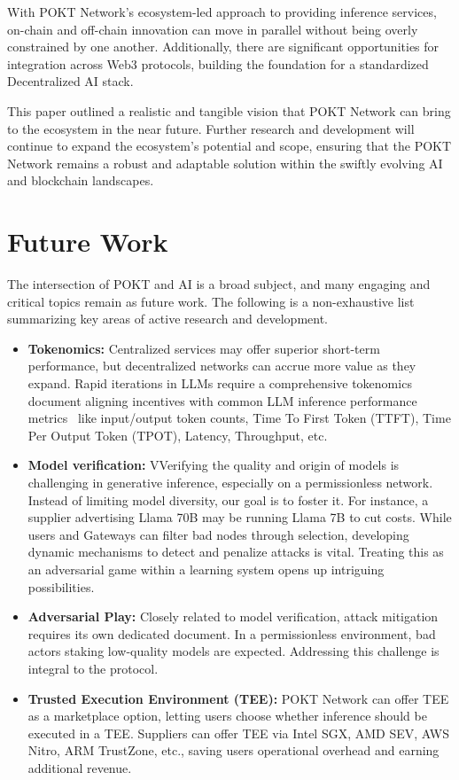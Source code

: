 \documentclass[conference,compsoc]{IEEEtran}
\begin{document}
With POKT Network’s ecosystem-led approach to providing inference services, on-chain and off-chain innovation can move in parallel without being overly constrained by one another. Additionally, there are significant opportunities for integration across Web3 protocols, building the foundation for a standardized Decentralized AI stack.

This paper outlined a realistic and tangible vision that POKT Network can bring to the ecosystem in the near future. Further research and development will continue to expand the ecosystem's potential and scope, ensuring that the POKT Network remains a robust and adaptable solution within the swiftly evolving AI and blockchain landscapes.

\section{Future Work}
The intersection of POKT and AI is a broad subject, and many engaging and critical topics remain as future work. The following is a non-exhaustive list summarizing key areas of active research and development.

\begin{itemize}
    \item \textbf{Tokenomics:} Centralized services may offer superior short-term performance, but decentralized networks can accrue more value as they expand. Rapid iterations in LLMs require a comprehensive tokenomics document aligning incentives with common LLM inference performance metrics~\cite{databricksInferencePerformance} like input/output token counts, Time To First Token (TTFT), Time Per Output Token (TPOT), Latency, Throughput, etc.

    \item \textbf{Model verification:} VVerifying the quality and origin of models is challenging in generative inference, especially on a permissionless network. Instead of limiting model diversity, our goal is to foster it. For instance, a supplier advertising Llama 70B may be running Llama 7B to cut costs. While users and Gateways can filter bad nodes through selection, developing dynamic mechanisms to detect and penalize attacks is vital. Treating this as an adversarial game within a learning system opens up intriguing possibilities.

    \item \textbf{Adversarial Play:} Closely related to model verification, attack mitigation requires its own dedicated document. In a permissionless environment, bad actors staking low-quality models are expected. Addressing this challenge is integral to the protocol. 

    \item \textbf{Trusted Execution Environment (TEE):} POKT Network can offer TEE as a marketplace option, letting users choose whether inference should be executed in a TEE. Suppliers can offer TEE via Intel SGX, AMD SEV, AWS Nitro, ARM TrustZone, etc., saving users operational overhead and earning additional revenue.


\end{itemize}
\end{document}
